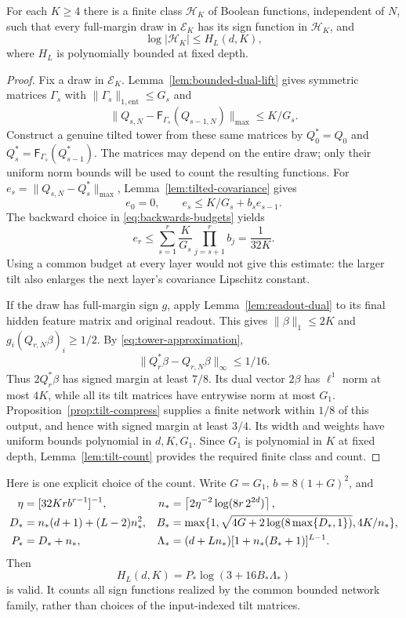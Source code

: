 \documentclass[11pt]{article}
\theoremstyle{remark}\newtheorem{remark}[theorem]{Remark}
\begin{document}
\begin{proposition}
\label{prop:good-compression}
For each $K\geq4$ there is a finite class $\mathcal H_K$ of Boolean
functions, independent of $N$, such that every full-margin draw in
$\mathcal E_K$ has its sign function in $\mathcal H_K$, and
\[
 \log|\mathcal H_K|\leq H_L(d,K),
\]
where $H_L$ is polynomially bounded at fixed depth.
\end{proposition}
\begin{proof}
Fix a draw in $\mathcal E_K$. Lemma~\ref{lem:bounded-dual-lift} gives
symmetric matrices $\Gamma_s$ with
$\|\Gamma_s\|_{1,\mathrm{ent}}\leq G_s$ and
\[
 \|Q_{s,N}-\mathsf F_{\Gamma_s}(Q_{s-1,N})\|_{\max}\leq K/G_s.
\]
Construct a genuine tilted tower from these same matrices by
$Q_0^*=Q_0$ and $Q_s^*=\mathsf F_{\Gamma_s}(Q_{s-1}^*)$.
The matrices may depend on the entire draw; only their uniform norm bounds
will be used to count the resulting functions.
For $e_s=\|Q_{s,N}-Q_s^*\|_{\max}$,
Lemma~\ref{lem:tilted-covariance} gives
\[
 e_0=0,\qquad e_s\leq K/G_s+b_s e_{s-1}.
\]
The backward choice in \eqref{eq:backwards-budgets} yields
\begin{equation}\label{eq:tower-approximation}
 e_r\leq\sum_{s=1}^r\frac K{G_s}\prod_{j=s+1}^r b_j
      =\frac1{32K}.
\end{equation}
Using a common budget at every layer would not give this estimate: the
larger tilt also enlarges the next layer's covariance Lipschitz constant.

If the draw has full-margin sign $g$, apply Lemma~\ref{lem:readout-dual}
to its final hidden feature matrix and original readout. This gives
$\|\beta\|_1\leq2K$ and $g_i(Q_{r,N}\beta)_i\geq1/2$.
By \eqref{eq:tower-approximation},
\[
 \|Q_r^*\beta-Q_{r,N}\beta\|_\infty\leq1/16.
\]
Thus $2Q_r^*\beta$ has signed margin at least $7/8$.
Its dual vector $2\beta$ has $\ell^1$ norm at most $4K$, while all its
tilt matrices have entrywise norm at most $G_1$.
Proposition~\ref{prop:tilt-compress} supplies a finite network within
$1/8$ of this output, and hence with signed margin at least $3/4$.
Its width and weights have uniform bounds polynomial in $d,K,G_1$.
Since $G_1$ is polynomial in $K$ at fixed depth, Lemma~\ref{lem:tilt-count}
provides the required finite class and count.
\end{proof}

Here is one explicit choice of the count. Write $G=G_1$,
$b=8(1+G)^2$, and
\begin{align}
 \eta&=[32Kr b^{r-1}]^{-1},&
 n_*&=\left\lceil2\eta^{-2}\log(8r\,2^{2d})\right\rceil,\notag\\
 D_*&=n_*(d+1)+(L-2)n_*^2,&
 B_*&=\max\{1,\sqrt{4G+2\log(8\max\{D_*,1\})},4K/n_*\},\notag\\
 P_*&=D_*+n_*,&
 \Lambda_*&=(d+Ln_*)[1+n_*(B_*+1)]^{L-1}.
 \label{eq:explicit-compression}
\end{align}
Then
\begin{equation}\label{eq:explicit-count}
 H_L(d,K)=P_*\log(3+16B_*\Lambda_*)
\end{equation}
is valid. It counts all sign functions realized by the common bounded
network family, rather than choices of the input-indexed tilt matrices.
\end{document}
